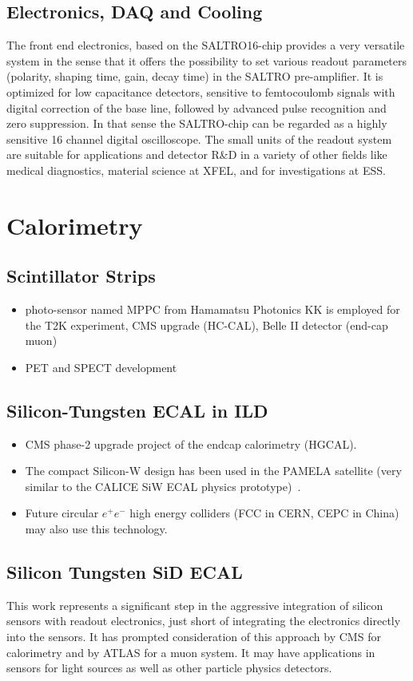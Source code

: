 \subsection{Electronics, DAQ and Cooling}
The front end electronics, based on the SALTRO16-chip provides a very versatile system in the sense that it offers the possibility to set various readout parameters (polarity, shaping time, gain, decay time) in the SALTRO pre-amplifier. It is optimized for low capacitance detectors, sensitive to femtocoulomb signals with digital correction of the base line, followed by advanced pulse recognition and zero suppression.  In that sense the SALTRO-chip can be regarded as a highly sensitive 16 channel digital oscilloscope. The small units of the readout system are suitable for applications and detector R\&D in a variety of other fields like medical diagnostics, material science at XFEL, and for investigations at ESS.

\section{Calorimetry}
\subsection{Scintillator Strips}
\begin{itemize}
	\item photo-sensor named MPPC from Hamamatsu Photonics KK is employed for the T2K experiment, CMS upgrade (HC-CAL), Belle II detector (end-cap muon)
	\item PET and SPECT development
\end{itemize}

\subsection{Silicon-Tungsten ECAL in ILD}
\begin{itemize}
\item CMS phase-2 upgrade project of the
 endcap calorimetry (HGCAL).
\item The compact Silicon-W design has been used in the PAMELA satellite (very
 similar to the CALICE SiW ECAL physics prototype)~\cite{1742-6596-160-1-012039}.
\item Future circular $e^+e^-$ high energy colliders (FCC in CERN, CEPC in China)
may also use this technology.
\end{itemize}

\subsection{Silicon Tungsten SiD ECAL}
This work represents a significant step in the aggressive integration of silicon sensors with readout electronics, just short of integrating the electronics directly into the sensors. It has prompted consideration of this approach by CMS for calorimetry and by ATLAS for a muon system.  It may have applications in sensors for light sources as well as other particle physics detectors.

